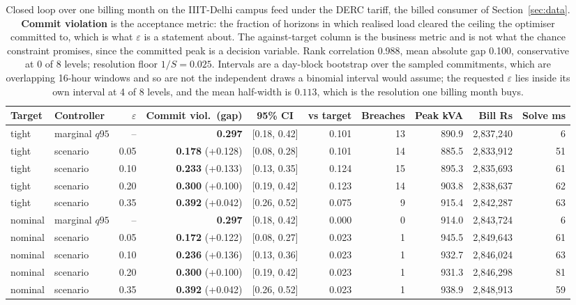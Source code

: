 \begin{table}[t]
\centering
\scriptsize
\setlength{\tabcolsep}{3pt}
\begin{tabular}{llrrcrrrrr}
\toprule
Target & Controller & $\varepsilon$ & Commit viol.\ (gap) & 95\% CI & vs target & Breaches & Peak kVA & Bill Rs & Solve ms \\
\midrule
tight & marginal $q95$ & -- & \textbf{0.297} & [0.18, 0.42] & 0.101 & 13 & 890.9 & 2,837,240 & 6 \\
tight & scenario & 0.05 & \textbf{0.178} (+0.128) & [0.08, 0.28] & 0.101 & 14 & 885.5 & 2,833,912 & 51 \\
tight & scenario & 0.10 & \textbf{0.233} (+0.133) & [0.13, 0.35] & 0.124 & 15 & 895.3 & 2,835,693 & 61 \\
tight & scenario & 0.20 & \textbf{0.300} (+0.100) & [0.19, 0.42] & 0.123 & 14 & 903.8 & 2,838,637 & 62 \\
tight & scenario & 0.35 & \textbf{0.392} (+0.042) & [0.26, 0.52] & 0.075 & 9 & 915.4 & 2,842,287 & 63 \\
nominal & marginal $q95$ & -- & \textbf{0.297} & [0.18, 0.42] & 0.000 & 0 & 914.0 & 2,843,724 & 6 \\
nominal & scenario & 0.05 & \textbf{0.172} (+0.122) & [0.08, 0.27] & 0.023 & 1 & 945.5 & 2,849,643 & 61 \\
nominal & scenario & 0.10 & \textbf{0.236} (+0.136) & [0.13, 0.36] & 0.023 & 1 & 932.7 & 2,846,024 & 63 \\
nominal & scenario & 0.20 & \textbf{0.300} (+0.100) & [0.19, 0.42] & 0.023 & 1 & 931.3 & 2,846,298 & 81 \\
nominal & scenario & 0.35 & \textbf{0.392} (+0.042) & [0.26, 0.52] & 0.023 & 1 & 938.9 & 2,848,913 & 59 \\
\bottomrule
\end{tabular}
\caption{Closed loop over one billing month on the IIIT-Delhi campus feed under the DERC tariff, the billed consumer of Section~\ref{sec:data}. \textbf{Commit violation} is the acceptance metric: the fraction of horizons in which realised load cleared the ceiling the optimiser committed to, which is what $\varepsilon$ is a statement about. The against-target column is the business metric and is not what the chance constraint promises, since the committed peak is a decision variable. Rank correlation 0.988, mean absolute gap 0.100, conservative at 0 of 8 levels; resolution floor $1/S=0.025$. Intervals are a day-block bootstrap over the sampled commitments, which are overlapping 16-hour windows and so are not the independent draws a binomial interval would assume; the requested $\varepsilon$ lies inside its own interval at 4 of 8 levels, and the mean half-width is $0.113$, which is the resolution one billing month buys.}
\label{tab:acceptance-campus}
\end{table}
